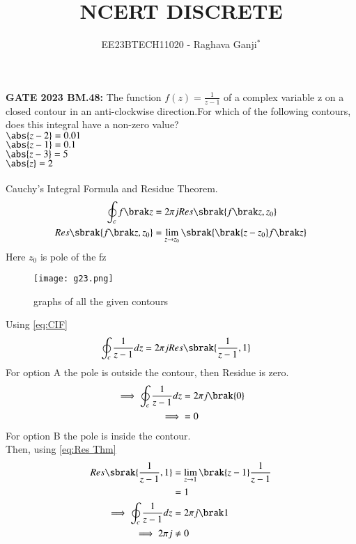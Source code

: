 \documentclass[journal,12pt,twocolumn]{IEEEtran}
\theoremstyle{remark}
\begin{document}

\vspace{3cm}

\title{NCERT DISCRETE}
\author{EE23BTECH11020 - Raghava Ganji$^{*}$%
}
\maketitle
\newpage
\bigskip

\renewcommand{\thefigure}{\theenumi}
\renewcommand{\thetable}{\theenumi}

\textbf{GATE 2023 BM.48:}
The function $f(z)=\frac{1}{z-1}$ of a complex variable z on a closed contour in an anti-clockwise direction.For which of the following contours, does this integral have a non-zero value?\\
$\abs{z-2}=0.01$\\
$\abs{z-1}=0.1$\\
$\abs{z-3}=5$\\
$\abs{z}=2$\\
\solution\\
Cauchy's Integral Formula and Residue Theorem.
\begin{align}
\oint_{c}f\brak z&=2\pi jRes\sbrak{f\brak z,z_0}\label{eq:CIF}\\
Res\sbrak{f\brak z,z_0}&=\lim_{z\to z_0}\sbrak{\brak{z-z_0}f\brak z}\label{eq:Res Thm}
\end{align}
Here $z_0$ is pole of the f\brak z\\
\begin{figure}[h!]
    \centering
    \texttt{[image: g23.png]}
    \caption{graphs of all the given contours}
\end{figure}
Using \eqref{eq:CIF}
\begin{align}
\oint_{c}\frac{1}{z-1}dz &=2\pi jRes\sbrak{\frac{1}{z-1},1}
\end{align}
For option A the pole is outside the contour, then Residue is zero.\\
\begin{align}
\implies\oint_{c}\frac{1}{z-1}dz &=2\pi j\brak{0}\\
\implies &=0
\end{align}
For option B the pole is inside the contour.\\
Then, using \eqref{eq:Res Thm}
\begin{align}
Res\sbrak{\frac{1}{z-1},1} &=\lim_{z\to 1}\brak{z-1}\frac{1}{z-1}\\
&=1\\
\implies \oint_{c}\frac{1}{z-1}dz&=2\pi j\brak 1\\
\implies 2\pi j&\neq 0
\end{align}
\end{document}

